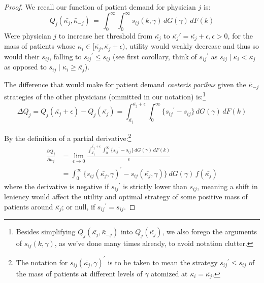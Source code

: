 \documentclass[../main.tex]{subfiles}
\begin{document}
\begin{proof}
We recall our function of patient demand for physician $j$ is:
    \[
    Q_j(\bar{\kappa_j}, \bar{\kappa}_{-j}) \,=\, \int_{0}^{\infty} \int_{0}^{\infty} s_{ij} (k, \gamma) \,dG(\gamma) \,dF(k) 
    \]
Were physician $j$ to increase her threshold from $\bar{\kappa_j}$ to $\bar{\kappa_j}' = \bar{\kappa_j} + \epsilon, \epsilon > 0$, for the mass of patients whose $\kappa_i \in [\bar{\kappa_j}, \bar{\kappa_j} + \epsilon)$, utility would weakly decrease and thus so would their $s_{ij}$, falling to ${s_{ij}}^{\prime} \leq s_{ij}$ (see first corollary, think of ${s_{ij}}^{\prime}$ as $s_{ij} \mid \kappa_i < \bar{\kappa_j}$ as opposed to $s_{ij} \mid \kappa_i \geq \bar{\kappa_j}$).

The difference that would make for patient demand \textit{caeteris paribus} given the $\bar{\kappa}_{-j}$ strategies of the other physicians (ommitted in our notation) is:\footnote{Besides simplifying $Q_j(\bar{\kappa_j}, \bar{\kappa}_{-j})$ into $Q_j(\bar{\kappa_j})$, we also forego the arguments of $s_{ij} (k, \gamma)$, as we've done many times already, to avoid notation clutter. }
\[
\Delta Q_j = Q_j(\bar{\kappa_j} + \epsilon) - Q_j(\bar{\kappa_j})=\int_{\bar{\kappa_j}}^{\bar{\kappa_j} + \epsilon} \int_{0}^{\infty} \{ {s_{ij}}^{\prime} - s_{ij}\} \,dG(\gamma) \,dF(k)
\]

By the definition of a partial derivative:\footnote{The notation for ${s_{ij}} (\bar{\kappa_j}, \gamma)^{\prime}$ is to be taken to mean the strategy ${s_{ij}}^{\prime} \leq s_{ij}$ of the mass of patients at different levels of $\gamma$ atomized at $\kappa_i = \bar{\kappa_j}$.}
\begin{align*}
    \frac{\partial Q_{j}}{\partial\bar{\kappa_{j}}} & = \lim_{\epsilon \rightarrow 0} \frac{\int_{\bar{\kappa_j}}^{\bar{\kappa_j} + \epsilon} \int_{0}^{\infty} \{ {s_{ij}}^{\prime} - s_{ij}\} \,dG(\gamma) \,dF(k)}{\epsilon} \\
    & = \int_{0}^{\infty} \{ {s_{ij}} (\bar{\kappa_j}, \gamma)^{\prime} - s_{ij} (\bar{\kappa_j}, \gamma)\} \,dG(\gamma) \,f(\bar{\kappa_j}) 
\end{align*}
where the derivative is negative if ${s_{ij}}^{\prime}$ is strictly lower than $s_{ij}$, meaning a shift in leniency would affect the utility and optimal strategy of some positive mass of patients around $\bar{\kappa_j}$; or null, if ${s_{ij}}^{\prime} = s_{ij}$.


\end{proof}
\end{document}
